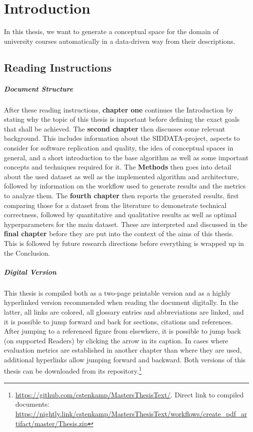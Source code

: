 \chapter{Introduction}

In this thesis, we want to generate a conceptual space for the domain of university courses automatically in a data-driven way from their descriptions.

\section{Reading Instructions}

\paragraph*{Document Structure}

After these reading instructions, \textbf{chapter one} continues the Introduction by stating why the topic of this thesis is important before defining the exact goals that shall be achieved. The \textbf{second chapter} then discusses some relevant background. This includes information about the SIDDATA-project, aspects to consider for software replication and quality, the idea of conceptual spaces in general, and a short introduction to the base algorithm as well as some important concepts and techniques required for it. The \textbf{Methods} then goes into detail about the used dataset as well as the implemented algorithm and architecture, followed by information on the workflow used to generate results and the metrics to analyze them. The \textbf{fourth chapter} then reports the generated results, first comparing those for a dataset from the literature to demonstrate technical correctness, followed by quantitative and qualitative results as well as optimal hyperparameters for the main dataset. These are interpreted and discussed in the \textbf{final chapter} before they are put into the context of the aims of this thesis. This is followed by future research directions before everything is wrapped up in the Conclusion.

\paragraph*{Digital Version}

This thesis is compiled both as a two-page printable version and as a highly hyperlinked version recommended when reading the document digitally. In the latter, all links are colored, all glossary entries and abbreviations are linked, and it is possible to jump forward and back for sections, citations and references. After jumping to a referenced figure from elsewhere, it is possible to jump back (on supported Readers) by clicking the arrow in its caption. In cases where \eg evaluation metrics are established in another chapter than where they are used, additional hyperlinks allow jumping forward and backward. Both versions of this thesis can be downloaded from its repository.\footnote{\url{https://github.com/cstenkamp/MastersThesisText/}. Direct link to compiled documents: \url{https://nightly.link/cstenkamp/MastersThesisText/workflows/create_pdf_artifact/master/Thesis.zip}}

